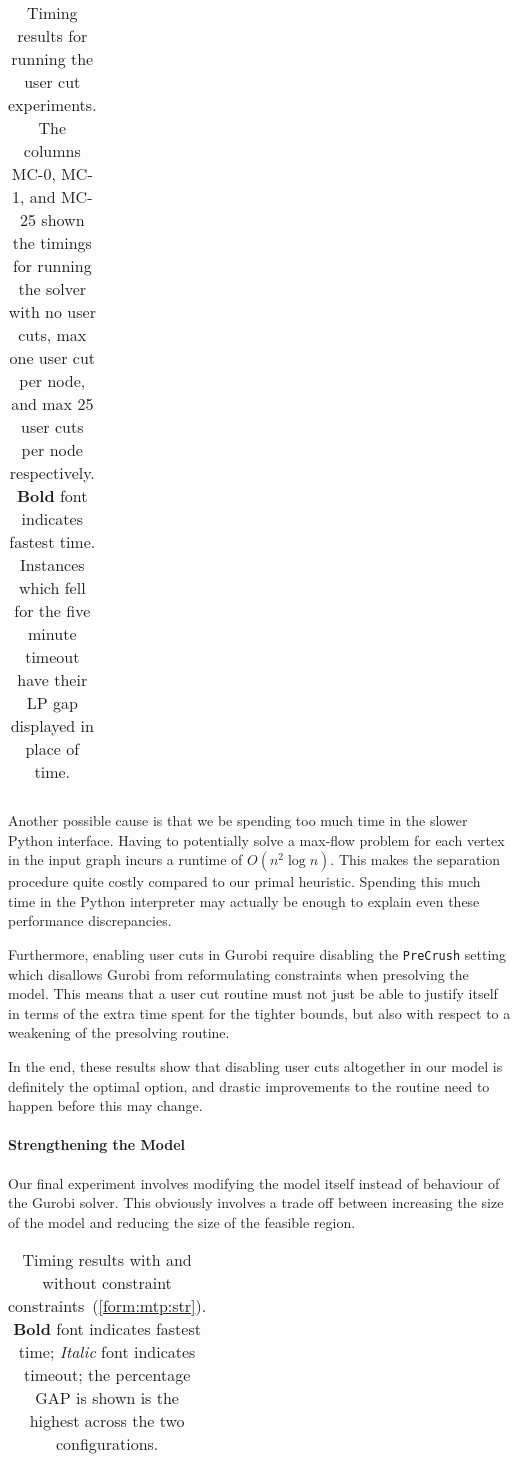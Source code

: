 \begin{table}[h!]
  \centering
  \begin{tabular}[h!]{|c|c|c|c|c|}\hline
    
  \end{tabular}
  \caption{Timing results for running the user cut experiments. The columns MC-0,
    MC-1, and MC-25 shown the timings for running the solver with no user cuts, max
    one user cut per node, and max 25 user cuts per node respectively.
    \textbf{Bold} font indicates fastest time. Instances which fell for the five minute
  timeout have their LP gap displayed in place of time.}\label{tab:jmp:maxcut}
\end{table}

Another possible cause is that we be spending too much time in the slower Python
interface. Having to potentially
solve a max-flow problem for each vertex in the input graph incurs a runtime
of $O(n^2 \log n)$. This makes the separation procedure quite costly compared
to our primal heuristic.
Spending this much time in the Python interpreter may actually be enough to explain
even these performance
discrepancies.

Furthermore, enabling user cuts in Gurobi require disabling the \texttt{PreCrush} setting
which disallows Gurobi from reformulating constraints when presolving the model. This means
that a user cut routine must not just be able to justify
itself in terms of the extra time spent for the tighter bounds,
but also with respect to a weakening of the presolving routine.

In the end, these results show that disabling user cuts altogether in our model is definitely
the optimal option, and drastic improvements to the routine need to happen before this may
change.

\paragraph{Strengthening the Model}
Our final experiment involves modifying the model itself instead of behaviour of the Gurobi solver.
This obviously involves a trade off between increasing the size of the model and reducing the size
of the feasible region.

\begin{table}[h!]
  \centering
  \begin{tabular}[h!]{|c|c|c|c|}\hline
    
  \end{tabular}
  \caption{Timing results with and without constraint constraints~(\ref{form:mtp:str}).
    \textbf{Bold} font indicates fastest time;
    \textit{Italic} font indicates
    timeout; the percentage GAP is shown is the highest across the two configurations.} 
  \label{tab:jmp:strengthen}
\end{table}

